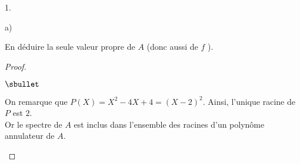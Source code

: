 \documentclass[11pt]{article}%
\begin{document}
\begin{noliste}{1.}
\item
  \begin{noliste}{a)}
    \setlength{\itemsep}{2mm}
  \item En déduire la seule valeur propre de $A$ (donc aussi de $f$ ).

    \begin{proof}~
      \begin{noliste}{$\sbullet$}
      \item On remarque que $P(X) = X^2 -4X +4 = (X-2)^2$. Ainsi,
        l'unique racine de $P$ est $2$.\\
        Or le spectre de $A$ est inclus dans l'ensemble des racines
        d'un polynôme annulateur de $A$.%




        


\end{noliste}
\end{proof}
\end{noliste}
\end{noliste}
\end{document}
